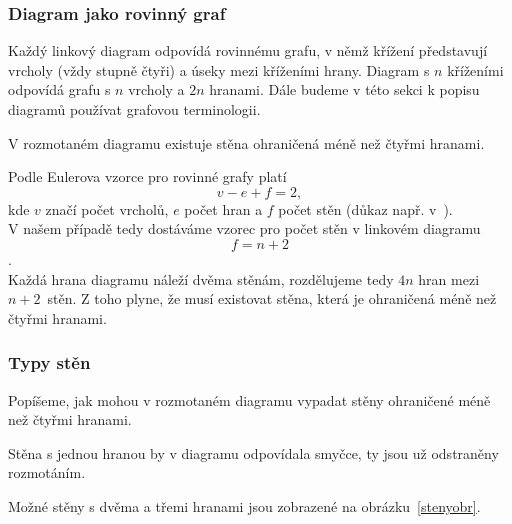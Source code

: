 \subsubsection{Diagram jako rovinný graf} \label{jakograf}
Každý linkový diagram odpovídá rovinnému grafu, v němž křížení představují vrcholy (vždy stupně čtyři) a úseky mezi kříženími hrany. Diagram s $n$ kříženími odpovídá grafu s $n$ vrcholy a $2n$ hranami.
Dále budeme v této sekci k popisu diagramů používat grafovou terminologii. 

\begin{lemma}
V rozmotaném diagramu existuje stěna ohraničená méně než čtyřmi hranami.
\end{lemma}

\begin{dukaz}
Podle Eulerova vzorce pro rovinné grafy platí $$v - e +f = 2,$$ kde $v$ značí počet vrcholů, $e$ počet hran a $f$ počet stěn (důkaz např. v~\cite{kapitoly}).
\\
V našem případě tedy dostáváme vzorec pro počet stěn v linkovém diagramu $$f = n+2$$.
\\
Každá hrana diagramu náleží dvěma stěnám, rozdělujeme tedy $4n$ hran mezi $n+2$~stěn. Z toho plyne, že musí existovat stěna, která je ohraničená méně než čtyřmi hranami. 
\end{dukaz} 

\subsubsection{Typy stěn} \label{steny}



Popíšeme, jak mohou v rozmotaném diagramu vypadat stěny ohraničené méně než čtyřmi hranami.

Stěna s jednou hranou by v diagramu odpovídala smyčce, ty jsou už odstraněny rozmotáním.

Možné stěny s dvěma a třemi hranami jsou zobrazené na obrázku~\ref{stenyobr}.

